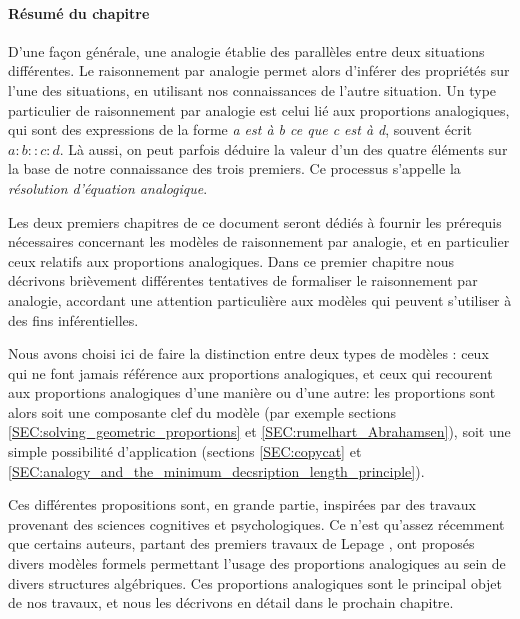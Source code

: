 \paragraph{Résumé du chapitre}

D'une façon générale, une analogie établie des parallèles entre deux situations
différentes. Le raisonnement par analogie permet alors d'inférer des propriétés
sur l'une des situations, en utilisant nos connaissances de l'autre situation.
Un type particulier de raisonnement par analogie est celui lié aux proportions
analogiques, qui sont des expressions de la forme \textit{a est à b ce que c
est à d}, souvent écrit $a:b::c:d$. Là aussi, on peut parfois déduire la valeur
d'un des quatre éléments sur la base de notre connaissance des trois premiers.
Ce processus s'appelle la \textit{résolution d'équation analogique}.

Les deux premiers chapitres de ce document seront dédiés à fournir les
prérequis nécessaires concernant les modèles de raisonnement par analogie, et
en particulier ceux relatifs aux proportions analogiques. Dans ce premier
chapitre nous décrivons brièvement différentes tentatives de formaliser le
raisonnement par analogie, accordant une attention particulière aux modèles qui
peuvent s'utiliser à des fins inférentielles.

Nous avons choisi ici de faire la distinction entre deux types de modèles :
ceux qui ne font jamais référence aux proportions analogiques, et ceux qui
recourent aux proportions analogiques d'une manière ou d'une autre: les
proportions sont alors soit une composante clef du modèle (par exemple sections
\ref{SEC:solving_geometric_proportions} et \ref{SEC:rumelhart_Abrahamsen}),
soit une simple possibilité d'application (sections \ref{SEC:copycat} et
\ref{SEC:analogy_and_the_minimum_decsription_length_principle}).

Ces différentes propositions sont, en grande partie, inspirées par des travaux
provenant des sciences cognitives et psychologiques. Ce n'est qu'assez
récemment que certains auteurs, partant des premiers travaux de Lepage
\cite{Lep04}, ont proposés divers modèles formels permettant l'usage des
proportions analogiques au sein de divers structures algébriques. Ces
proportions analogiques sont le principal objet de nos travaux, et nous les
décrivons en détail dans le prochain chapitre.
